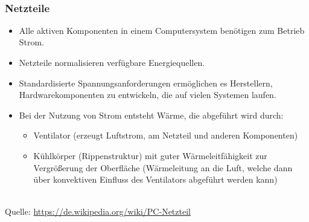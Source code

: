 ~\\
\begin{minipage}[t]{0.7\textwidth}
	\subsubsection{Netzteile}
	\begin{itemize}
		\item Alle aktiven Komponenten in einem Computersystem benötigen zum Betrieb Strom.
		\item Netzteile normalisieren verfügbare Energiequellen.
		\item Standardisierte Spannungsanforderungen ermöglichen es Herstellern, Hardwarekomponenten zu entwickeln, die auf vielen Systemen laufen.
		\item Bei der Nutzung von Strom entsteht Wärme, die abgeführt wird durch:
		\begin{itemize}
			\item Ventilator (erzeugt Luftstrom, am Netzteil und anderen Komponenten)
			\item Kühlkörper (Rippenstruktur) mit guter Wärmeleitfähigkeit zur Vergrößerung der Oberfläche (Wärmeleitung an die Luft, welche dann über konvektiven Einfluss des Ventilators abgeführt werden kann)
		\end{itemize}
	\end{itemize}
\end{minipage}
\begin{minipage}[t]{0.3\textwidth}
	\centering
	~\\
	\tiny
	Quelle: \url{https://de.wikipedia.org/wiki/PC-Netzteil}
\end{minipage}

